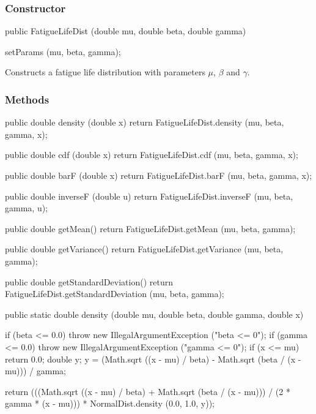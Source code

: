 \subsubsection* {Constructor}

\begin{code}

   public FatigueLifeDist (double mu, double beta, double gamma)\begin{hide} {
      setParams (mu, beta, gamma);
   }\end{hide}
\end{code}
\begin{tabb}
   Constructs a fatigue life distribution with parameters
   $\mu$, $\beta$ and $\gamma$.
\end{tabb}

\subsubsection* {Methods}
\begin{code}\begin{hide}

   public double density (double x) {
      return FatigueLifeDist.density (mu, beta, gamma, x);
   }

   public double cdf (double x) {
      return FatigueLifeDist.cdf (mu, beta, gamma, x);
   }

   public double barF (double x) {
      return FatigueLifeDist.barF (mu, beta, gamma, x);
   }

   public double inverseF (double u) {
      return FatigueLifeDist.inverseF (mu, beta, gamma, u);
   }

   public double getMean() {
      return FatigueLifeDist.getMean (mu, beta, gamma);      
   }

   public double getVariance() {
      return FatigueLifeDist.getVariance (mu, beta, gamma);      
   }

   public double getStandardDeviation() {
      return FatigueLifeDist.getStandardDeviation (mu, beta, gamma);      
   }\end{hide}

   public static double density (double mu, double beta, double gamma,
                                 double x)\begin{hide} {
      if (beta <= 0.0)
         throw new IllegalArgumentException ("beta <= 0");
      if (gamma <= 0.0)
         throw new IllegalArgumentException ("gamma <= 0");
      if (x <= mu)
         return 0.0;
      double y;
      y = (Math.sqrt ((x - mu) / beta) - Math.sqrt (beta / (x - mu))) / gamma;

      return (((Math.sqrt ((x - mu) / beta) + Math.sqrt (beta / (x - mu))) /
              (2 * gamma * (x - mu))) * NormalDist.density (0.0, 1.0, y));
   }\end{hide}
\end{code}
